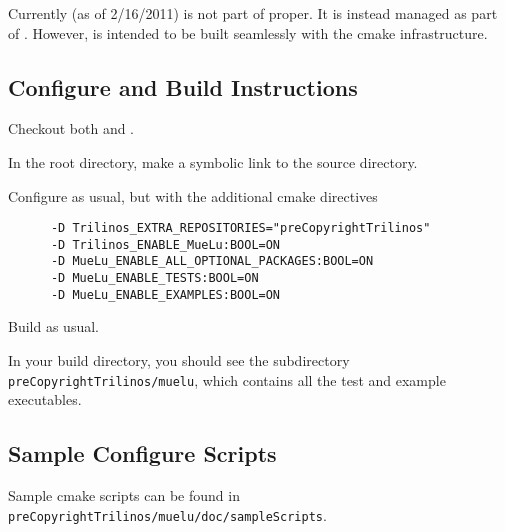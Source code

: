 Currently (as of 2/16/2011) \muelu is not part of \trilinos proper.  It is instead managed as part of \pct.
However, \muelu is intended to be built seamlessly with the \trilinos cmake infrastructure.

\subsection{Configure and Build Instructions}

\be
  \item Checkout both \trilinos and \pct.
  \item In the \trilinos root directory, make a symbolic link to the \pct source directory.
  \item Configure \trilinos as usual, but with the additional cmake directives\\
    \begin{verbatim}
      -D Trilinos_EXTRA_REPOSITORIES="preCopyrightTrilinos"
      -D Trilinos_ENABLE_MueLu:BOOL=ON
      -D MueLu_ENABLE_ALL_OPTIONAL_PACKAGES:BOOL=ON
      -D MueLu_ENABLE_TESTS:BOOL=ON
      -D MueLu_ENABLE_EXAMPLES:BOOL=ON
    \end{verbatim}
  \item Build \trilinos as usual.
  \item In your build directory, you should see the subdirectory \verb!preCopyrightTrilinos/muelu!, which contains all the test and
  example executables.
\ee

\subsection{Sample Configure Scripts}

Sample cmake scripts can be found in \verb!preCopyrightTrilinos/muelu/doc/sampleScripts!.
